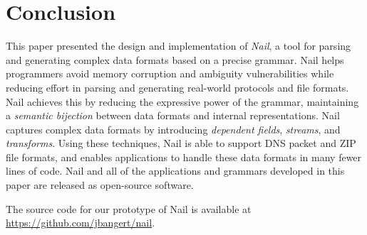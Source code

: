 \section{Conclusion}
\label{s:concl}

This paper presented the design and implementation of \textit{Nail},
a tool for parsing and generating complex data formats based on a
precise grammar.  Nail helps programmers avoid
memory corruption and ambiguity vulnerabilities while reducing effort
in parsing and generating real-world protocols and file formats.
Nail achieves this by reducing the expressive power of the grammar,
maintaining a \emph{semantic bijection} between data formats and internal
representations.  Nail captures complex data formats by introducing
\emph{dependent fields}, \emph{streams}, and \emph{transforms}.
Using these techniques, Nail is able to support DNS packet and ZIP file
formats, and enables applications to handle these data formats in many
fewer lines of code.
Nail and all of the applications and grammars developed in this paper
are released as open-source software.

The source code for our prototype of Nail is available at
\url{https://github.com/jbangert/nail}.

